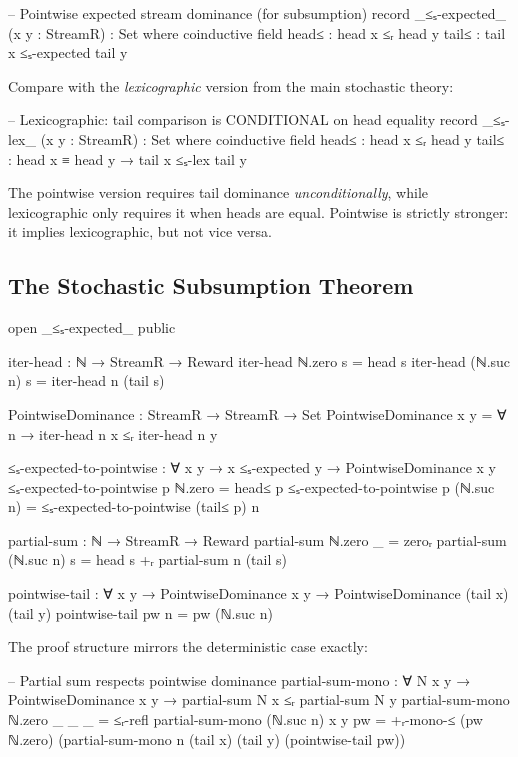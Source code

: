 \documentclass[9pt,a4paper]{article}
\theoremstyle{plain}
\theoremstyle{definition}
\theoremstyle{remark}
\begin{document}
\begin{code}
  -- Pointwise expected stream dominance (for subsumption)
  record _≤ₛ-expected_ (x y : StreamR) : Set where
    coinductive
    field
      head≤ : head x ≤ᵣ head y
      tail≤ : tail x ≤ₛ-expected tail y
\end{code}

Compare with the \emph{lexicographic} version from the main stochastic theory:

\begin{code}
  -- Lexicographic: tail comparison is CONDITIONAL on head equality
  record _≤ₛ-lex_ (x y : StreamR) : Set where
    coinductive
    field
      head≤ : head x ≤ᵣ head y
      tail≤ : head x ≡ head y → tail x ≤ₛ-lex tail y
\end{code}

The pointwise version requires tail dominance \emph{unconditionally}, while lexicographic only requires it when heads are equal. Pointwise is strictly stronger: it implies lexicographic, but not vice versa.

\subsection{The Stochastic Subsumption Theorem}

\begin{code}[hide]
  open _≤ₛ-expected_ public

  iter-head : ℕ → StreamR → Reward
  iter-head ℕ.zero    s = head s
  iter-head (ℕ.suc n) s = iter-head n (tail s)

  PointwiseDominance : StreamR → StreamR → Set
  PointwiseDominance x y = ∀ n → iter-head n x ≤ᵣ iter-head n y

  ≤ₛ-expected-to-pointwise : ∀ {x y} → x ≤ₛ-expected y → PointwiseDominance x y
  ≤ₛ-expected-to-pointwise p ℕ.zero    = head≤ p
  ≤ₛ-expected-to-pointwise p (ℕ.suc n) = ≤ₛ-expected-to-pointwise (tail≤ p) n

  partial-sum : ℕ → StreamR → Reward
  partial-sum ℕ.zero    _ = zeroᵣ
  partial-sum (ℕ.suc n) s = head s +ᵣ partial-sum n (tail s)

  pointwise-tail : ∀ {x y} → PointwiseDominance x y → PointwiseDominance (tail x) (tail y)
  pointwise-tail pw n = pw (ℕ.suc n)
\end{code}

The proof structure mirrors the deterministic case exactly:

\begin{code}
  -- Partial sum respects pointwise dominance
  partial-sum-mono : ∀ N x y → PointwiseDominance x y →
                     partial-sum N x ≤ᵣ partial-sum N y
  partial-sum-mono ℕ.zero    _ _ _  = ≤ᵣ-refl
  partial-sum-mono (ℕ.suc n) x y pw =
    +ᵣ-mono-≤ (pw ℕ.zero)
              (partial-sum-mono n (tail x) (tail y) (pointwise-tail pw))
\end{code}
\end{document}
